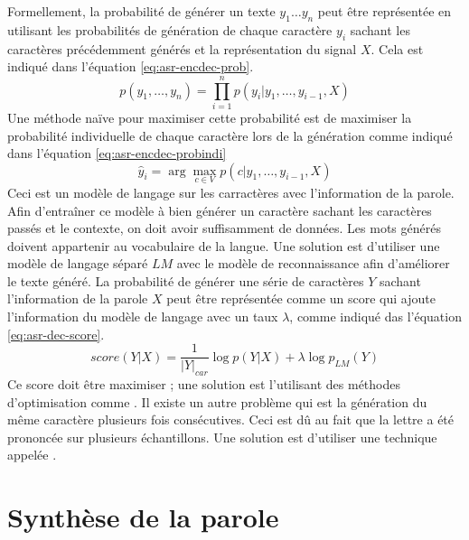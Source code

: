 \documentclass{KodeBook}
\begin{document}
Formellement, la probabilité de générer un texte $y_1 \ldots y_n$ peut être représentée en utilisant les probabilités de génération de chaque caractère $y_i$ sachant les caractères précédemment générés et la représentation du signal $X$. 
Cela est indiqué dans l'équation \ref{eq:asr-encdec-prob}.
\begin{equation}\label{eq:asr-encdec-prob}
p(y_1, \ldots, y_n) = \prod\limits_{i=1}^n p(y_i| y_1, \ldots, y_{i-1}, X)
\end{equation}
Une méthode naïve pour maximiser cette probabilité est de maximiser la probabilité individuelle de chaque caractère lors de la génération comme indiqué dans l'équation \ref{eq:asr-encdec-probindi}
\begin{equation}\label{eq:asr-encdec-probindi}
\hat{y}_i = \arg\max_{c \in V} p(c| y_1, \ldots, y_{i-1}, X)
\end{equation}
Ceci est un modèle de langage sur les carractères avec l'information de la parole. 
Afin d'entraîner ce modèle à bien générer un caractère sachant les caractères passés et le contexte, on doit avoir suffisamment de données. 
Les mots générés doivent appartenir au vocabulaire de la langue.
Une solution est d'utiliser une modèle de langage séparé $LM$ avec le modèle de reconnaissance afin d'améliorer le texte généré.
La probabilité de générer une série de caractères $Y$ sachant l'information de la parole $X$ peut être représentée comme un score qui ajoute l'information du modèle de langage avec un taux $\lambda$, comme indiqué das l'équation \ref{eq:asr-dec-score}.
\begin{equation}\label{eq:asr-dec-score}
score(Y|X) = \frac{1}{|Y|_{car}} \log p(Y|X) + \lambda \log p_{LM}(Y)
\end{equation}
Ce score doit être maximiser ; une solution est l'utilisant des méthodes d'optimisation comme .
Il existe un autre problème qui est la génération du même caractère plusieurs fois consécutives. 
Ceci est dû au fait que la lettre a été prononcée sur plusieurs échantillons. 
Une solution est d'utiliser une technique appelée .


\section{Synthèse de la parole}
\end{document}
